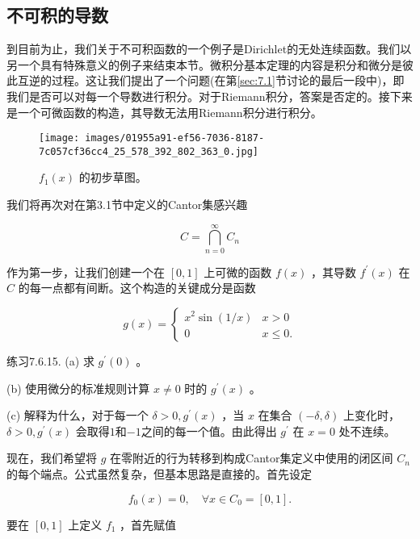 \subsection{不可积的导数}

到目前为止，我们关于不可积函数的一个例子是Dirichlet的无处连续函数。我们以另一个具有特殊意义的例子来结束本节。微积分基本定理的内容是积分和微分是彼此互逆的过程。这让我们提出了一个问题(在第\ref{sec:7.1}节讨论的最后一段中)，即我们是否可以对每一个导数进行积分。对于Riemann积分，答案是否定的。接下来是一个可微函数的构造，其导数无法用Riemann积分进行积分。


\begin{figure}[h]
  \centering
  \texttt{[image: images/01955a91-ef56-7036-8187-7c057cf36cc4\_25\_578\_392\_802\_363\_0.jpg]}
  \caption{\({f}_{1}\left( x\right)\) 的初步草图。}
  \label{fig:7.3}
\end{figure}

我们将再次对在第3.1节中定义的Cantor集感兴趣

\[
C = \mathop{\bigcap }\limits_{{n = 0}}^{\infty }{C}_{n}
\]

作为第一步，让我们创建一个在 \(\left\lbrack  {0,1}\right\rbrack\) 上可微的函数 \(f\left( x\right)\) ，其导数 \({f}^{\prime }\left( x\right)\) 在 \(C\) 的每一点都有间断。这个构造的关键成分是函数

\[
g\left( x\right)  = \left\{  \begin{array}{ll} {x}^{2}\sin \left( {1/x}\right) & x > 0 \\  0 &x \leq  0. \end{array}\right.
\]

练习7.6.15. (a) 求 \({g}^{\prime }\left( 0\right)\) 。

(b) 使用微分的标准规则计算 $x\ne 0 $ 时的 \({g}^{\prime }\left( x\right)\) 。

(c) 解释为什么，对于每一个 \(\delta  > 0,{g}^{\prime }\left( x\right)\) ，当 \(x\) 在集合 \(\left( {-\delta ,\delta }\right)\) 上变化时， \(\delta  > 0,{g}^{\prime }\left( x\right)\) 会取得\(1\)和\(-1\)之间的每一个值。由此得出 \({g}^{\prime }\) 在 \(x = 0\) 处不连续。

现在，我们希望将 \(g\) 在零附近的行为转移到构成Cantor集定义中使用的闭区间 \({C}_{n}\) 的每个端点。公式虽然复杂，但基本思路是直接的。首先设定

\[
{f}_{0}\left( x\right)  = 0,\quad \forall x \in {C}_{0} = \left\lbrack  {0,1}\right\rbrack  .
\]

要在 \(\left\lbrack  {0,1}\right\rbrack\) 上定义 \({f}_{1}\) ，首先赋值

